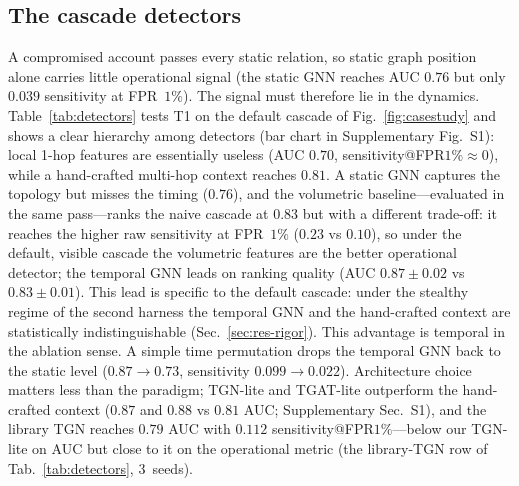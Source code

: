 \subsection{The cascade detectors}
\label{sec:res-detectors}
A compromised account passes every static relation, so static graph position alone carries little
operational signal (the static GNN reaches AUC $0.76$ but only $0.039$ sensitivity at FPR~$1\%$). The
signal must therefore lie in the dynamics. Table~\ref{tab:detectors} tests T1 on the default cascade of
Fig.~\ref{fig:casestudy} and shows a clear hierarchy among detectors (bar chart in Supplementary Fig.~S1):
local 1-hop features are essentially useless (AUC $0.70$, sensitivity@FPR$1\%\!\approx\!0$), while a
hand-crafted multi-hop context reaches $0.81$. A static GNN captures the topology but misses the timing
($0.76$), and the volumetric baseline---evaluated in the same pass---ranks the naive cascade at $0.83$
but with a different trade-off: it reaches the higher raw sensitivity at FPR~$1\%$ ($0.23$ vs $0.10$),
so under the default, visible cascade the volumetric features are the better operational detector; the
temporal GNN leads on ranking quality (AUC $0.87{\pm}0.02$ vs $0.83{\pm}0.01$). This lead is
specific to the default cascade: under the stealthy regime of the second harness the temporal GNN and the
hand-crafted context are statistically indistinguishable (Sec.~\ref{sec:res-rigor}). This advantage is
temporal in the ablation sense. A simple time permutation drops the temporal GNN back to the static level
($0.87\!\to\!0.73$, sensitivity $0.099\!\to\!0.022$). Architecture choice matters less than the paradigm;
TGN-lite and TGAT-lite outperform the hand-crafted context ($0.87$ and $0.88$ vs $0.81$ AUC;
Supplementary Sec.~S1), and the library TGN
\citep{rossi2020temporal} reaches $0.79$ AUC with $0.112$ sensitivity@FPR$1\%$---below our TGN-lite on
AUC but close to it on the operational metric (the library-TGN row of Tab.~\ref{tab:detectors}, $3$~seeds).

